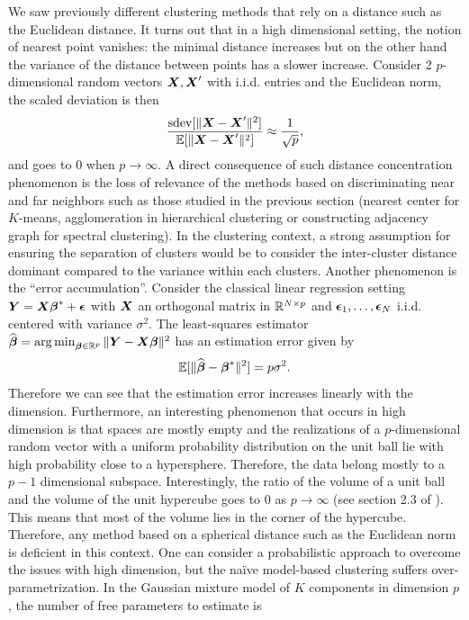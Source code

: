 We saw previously different clustering methods that rely on a distance such as the Euclidean distance. It turns out that in a high dimensional setting, the notion of nearest point vanishes: the minimal distance increases but on the other hand the variance of the distance between points has a slower increase. Consider 2 $p$-dimensional random vectors $\boldsymbol X,\boldsymbol X'$ with i.i.d. entries and the Euclidean norm, the scaled deviation is then
\begin{equation}
  \frac{\textnormal{sdev}[\|\boldsymbol X-\boldsymbol X'\|^2]}{{\mathbb E}[\|\boldsymbol X-\boldsymbol X'\|^2]} \approx \frac{1}{\sqrt{p}},
\end{equation}
and goes to $0$ when $p\rightarrow\infty$. A direct consequence of such distance concentration phenomenon is the loss of relevance of the methods based on discriminating near and far neighbors such as those studied in the previous section (nearest center for $K$-means, agglomeration in hierarchical clustering or constructing adjacency graph for spectral clustering). In the clustering context, a strong assumption for ensuring the separation of clusters would be to consider the inter-cluster distance dominant compared to the variance within each clusters. Another phenomenon is the ``error accumulation''. Consider the classical linear regression setting  $\boldsymbol Y=\boldsymbol X\boldsymbol \beta^*+\boldsymbol\epsilon$ with $\boldsymbol X$ an orthogonal matrix in ${\mathbb R}^{N\times p}$ and $\boldsymbol\epsilon_1,\dots,\boldsymbol\epsilon_N$ i.i.d. centered with variance $\sigma^2$. The least-squares estimator $\widehat{\boldsymbol \beta} = \operatorname*{arg\,min}_{\boldsymbol \beta\in{\mathbb R}^{p}}\|\boldsymbol Y-\boldsymbol X\boldsymbol \beta\|^2$ has an estimation error given by
\begin{equation}
  {\mathbb E}[\|\widehat{\boldsymbol \beta}-\boldsymbol \beta^*\|^2]=p\sigma^2.
\end{equation}
Therefore we can see that the estimation error increases linearly with the dimension. Furthermore, an interesting phenomenon that occurs in high dimension is that spaces are mostly empty and the realizations of a $p$-dimensional random vector with a uniform probability distribution on the unit ball lie with high probability close to a hypersphere. Therefore, the data belong mostly to a $p-1$ dimensional subspace. Interestingly, the ratio of the volume of a unit ball and the volume of the unit hypercube goes to 0 as $p\rightarrow\infty$ (see section 2.3 of \citep{Zimek2012}). This means that most of the volume lies in the corner of the hypercube. Therefore, any method based on a spherical distance such as the Euclidean norm is deficient in this context. One can consider a probabilistic approach to overcome the issues with high dimension, but the naïve model-based clustering suffers over-parametrization. In the Gaussian mixture model of $K$ components in dimension $p$, the number of free parameters to estimate is
